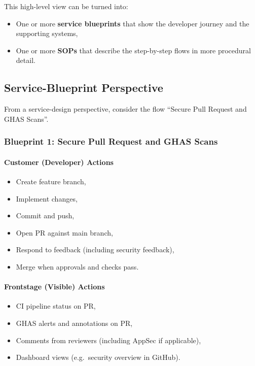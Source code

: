 \documentclass[11pt]{article}
\begin{document}
This high-level view can be turned into:

\begin{itemize}
  \item One or more \textbf{service blueprints} that show the
        developer journey and the supporting systems,
  \item One or more \textbf{SOPs} that describe the step-by-step
        flows in more procedural detail.
\end{itemize}

\subsection{Service-Blueprint Perspective}

From a service-design perspective, consider the flow
``Secure Pull Request and GHAS Scans''.

\subsubsection*{Blueprint 1: Secure Pull Request and GHAS Scans}

\paragraph{Customer (Developer) Actions}

\begin{itemize}
  \item Create feature branch,
  \item Implement changes,
  \item Commit and push,
  \item Open PR against main branch,
  \item Respond to feedback (including security feedback),
  \item Merge when approvals and checks pass.
\end{itemize}

\paragraph{Frontstage (Visible) Actions}

\begin{itemize}
  \item CI pipeline status on PR,
  \item GHAS alerts and annotations on PR,
  \item Comments from reviewers (including AppSec if applicable),
  \item Dashboard views (e.g.\ security overview in GitHub).
\end{itemize}
\end{document}
